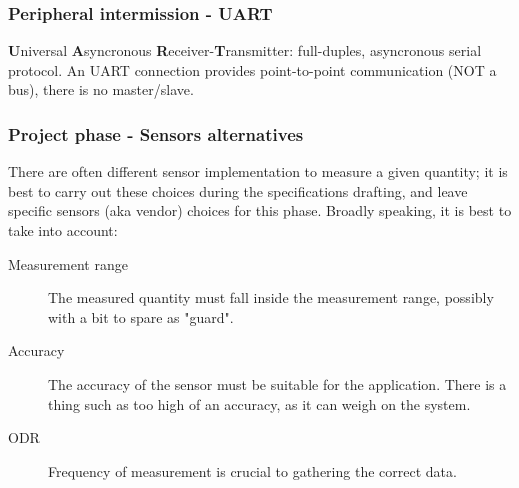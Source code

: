 \documentclass[11pt,xcolor=table,aspectratio=169]{beamer}
\begin{document}
	\begin{frame}
		\frametitle{Peripheral intermission - UART}
		\textbf{U}niversal \textbf{A}syncronous \textbf{R}eceiver-\textbf{T}ransmitter: full-duples, asyncronous serial protocol. An UART connection provides point-to-point communication (NOT a bus), there is no master/slave.
		\vspace{.3cm}
		\begin{center}
			\begin{adjustbox}{max width=1.5\textwidth}
			\end{adjustbox}
		\end{center}
	\end{frame}

	\begin{frame}
		\frametitle{Project phase - Sensors alternatives}
		There are often different sensor implementation to measure a given quantity; it is best to carry out these choices during the specifications drafting, and leave specific sensors (aka vendor) choices for this phase. Broadly speaking, it is best to take into account:
		\begin{description}
			\item[Measurement range] The measured quantity must fall inside the measurement range, possibly with a bit to spare as "guard".
			\item[Accuracy] The accuracy of the sensor must be suitable for the application. There is a thing such as too high of an accuracy, as it can weigh on the system.
			\item[ODR] Frequency of measurement is crucial to gathering the correct data. 
		\end{description}
	\end{frame}
\end{document}
